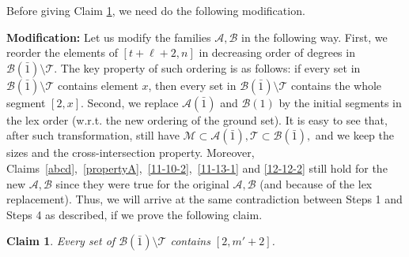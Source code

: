 \documentclass[11pt]{article}
\newcommand{\m}{\mathcal}
\newtheorem{claim}[theorem]{Claim}
\begin{document}
\iffalse
Before giving Claim \ref{11-19-1}, we need do the following modification.

{\bf Modification:}
Let us modify the families $\m A, \m B$ in the following way.  First, we reorder  the elements of $[t+\ell+2,n]$ in decreasing order of degrees in $\m B(\bar 1)\setminus \m T$. The key property of such ordering is as follows: if every set in $\m B(\bar 1)\setminus \m T$ contains element $x$, then every set in  $\m B(\bar 1)\setminus \m T$ contains the whole segment $[2,x].$
Second, we replace  $\m A(\bar 1)$ and $\m B(1)$ by the initial segments in the lex order (w.r.t. the new ordering of the ground set). It is easy to see that, after such transformation, still have $\m M\subset \m A(\bar 1), \m T\subset \m B(\bar 1),$ and we keep the sizes and the cross-intersection property. Moreover, Claims~\ref{abcd},~\ref{propertyA},~\ref{11-10-2},~\ref{11-13-1} and \eqref{12-12-2} still hold for the new $\m A, \m B$ since they were true for the original $\m A, \m B$ (and because of the lex replacement). Thus, we will arrive at the same contradiction between Steps 1 and Steps 4 as described, if we prove the following claim.



\begin{claim}\label{11-19-1}
Every set of $\mathcal{B}(\bar{1})\setminus \mathcal{T}$ contains $[2, m'+2]$.
\end{claim}
\end{document}
